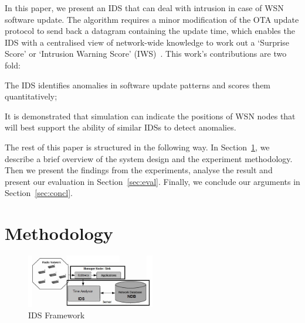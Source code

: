 \documentclass[conference]{IEEEtran}
\begin{document}
In this paper, we present an IDS that can deal with intrusion in case of WSN software update.
The algorithm requires a minor modification of the OTA update protocol to send back a datagram containing the update time, 
which enables the IDS with a centralised view of network-wide knowledge to work out a  `Surprise Score' or `Intrusion Warning Score' (IWS)~\cite{aalam14, aalam15}.
This work's contributions are two fold: 
\begin{inparaenum}
\item  The IDS identifies anomalies in software update patterns and scores them quantitatively;
\item It is demonstrated that simulation can indicate the positions of WSN nodes that will best support the ability of similar IDSs to detect anomalies.
\end{inparaenum}
The rest of this paper is structured in the following way. 
In Section~\ref{sec:meth}, we describe a brief overview of the system  design and the experiment methodology. 
Then we  present the findings from the experiments, analyse the result and present our evaluation in Section~\ref{sec:eval}.  
Finally, we conclude our arguments in Section~\ref{sec:concl}.


\section{Methodology}
\label{sec:meth}

\begin{figure}[t]
    \centering
    \includegraphics[width=0.5\textwidth]{IDS_fw}	
    \caption{IDS Framework}
    \label{fig:ids_fw}
\end{figure}
\end{document}
